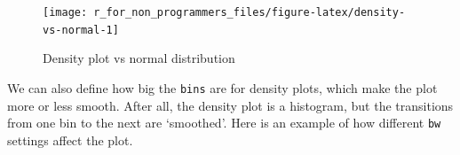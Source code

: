 \documentclass[
]{book}
\newenvironment{Shaded}{\begin{snugshade}}{\end{snugshade}}
\newcommand{\AttributeTok}[1]{\textcolor[rgb]{0.77,0.63,0.00}{#1}}
\newcommand{\CommentTok}[1]{\textcolor[rgb]{0.56,0.35,0.01}{\textit{#1}}}
\newcommand{\DecValTok}[1]{\textcolor[rgb]{0.00,0.00,0.81}{#1}}
\newcommand{\FunctionTok}[1]{\textcolor[rgb]{0.00,0.00,0.00}{#1}}
\newcommand{\NormalTok}[1]{#1}
\newcommand{\OtherTok}[1]{\textcolor[rgb]{0.56,0.35,0.01}{#1}}
\newcommand{\SpecialCharTok}[1]{\textcolor[rgb]{0.00,0.00,0.00}{#1}}
\newcommand{\StringTok}[1]{\textcolor[rgb]{0.31,0.60,0.02}{#1}}
\begin{document}
\begin{Shaded}
\end{Shaded}

\begin{figure}

{\centering \texttt{[image: r\_for\_non\_programmers\_files/figure-latex/density-vs-normal-1]} 

}

\caption{Density plot vs normal distribution}\label{fig:density-vs-normal}
\end{figure}

We can also define how big the \texttt{bins} are for density plots, which make the plot more or less smooth. After all, the density plot is a histogram, but the transitions from one bin to the next are `smoothed'. Here is an example of how different \texttt{bw} settings affect the plot.
\end{document}
